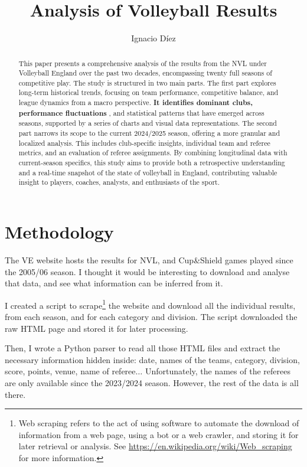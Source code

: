 \documentclass[10pt,a4paper,1.5lines]{article}
\author{Ignacio D\'iez}
\title{Analysis of Volleyball Results}
\newcommand{\todo}[1][ToDo]{
  \textcolor{WildStrawberry}{
    \Large{\textbf{#1}}
  }
}
\begin{document}
\maketitle

\begin{abstract}
This paper presents a comprehensive analysis of the results from the \ac{NVL} under Volleyball England over the past two decades, encompassing twenty full seasons of competitive play. The study is structured in two main parts. The first part explores long-term historical trends, focusing on team performance, competitive balance, and league dynamics from a macro perspective. \todo[It identifies dominant clubs, performance fluctuations], and statistical patterns that have emerged across seasons, supported by a series of charts and visual data representations. The second part narrows its scope to the current 2024/2025 season, offering a more granular and localized analysis. This includes club-specific insights, individual team and referee metrics, and an evaluation of referee assignments. By combining longitudinal data with current-season specifics, this study aims to provide both a retrospective understanding and a real-time snapshot of the state of volleyball in England, contributing valuable insight to players, coaches, analysts, and enthusiasts of the sport.\end{abstract}

\section{Methodology}
The \ac{VE} website hosts the results for \ac{NVL},  and Cup\&Shield games played since the 2005/06 season. I thought it would be interesting to download and analyse that data, and see what information can be inferred from it.

I created a script to scrape\footnote{Web scraping refers to the act of using software to automate the download of information from a web page, using a bot or a web crawler, and storing it for later retrieval or analysis. See \url{https://en.wikipedia.org/wiki/Web_scraping} for more information.} the website and download all the individual results, from each season, and for each category and division. The script downloaded the raw \ac{HTML} page and stored it for later processing.

Then, I wrote a Python parser to read all those \ac{HTML} files and extract the necessary information hidden inside: date, names of the teams, category, division, score, points, venue, name of referee$\ldots$ Unfortunately, the names of the referees are only available since the 2023/2024 season. However, the rest of the data is all there.
\end{document}

